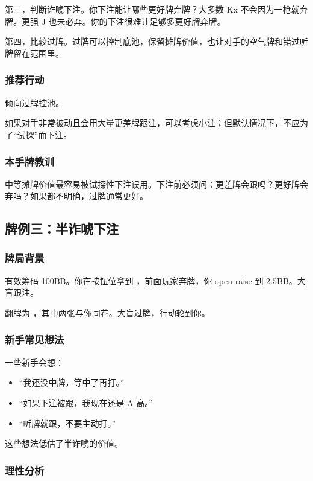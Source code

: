 第三，判断诈唬下注。你下注能让哪些更好牌弃牌？大多数 Kx 不会因为一枪就弃牌。更强 J 也未必弃。你的下注很难让足够多更好牌弃牌。

第四，比较过牌。过牌可以控制底池，保留摊牌价值，也让对手的空气牌和错过听牌留在范围里。

\subsubsection*{推荐行动}

倾向过牌控池。

如果对手非常被动且会用大量更差牌跟注，可以考虑小注；但默认情况下，不应为了“试探”而下注。

\subsubsection*{本手牌教训}

中等摊牌价值最容易被试探性下注误用。下注前必须问：更差牌会跟吗？更好牌会弃吗？如果都不明确，过牌通常更好。

\subsection{牌例三：半诈唬下注}

\subsubsection*{牌局背景}

有效筹码 100BB。你在按钮位拿到 ，前面玩家弃牌，你 open raise 到 2.5BB。大盲跟注。

翻牌为 ，其中两张与你同花。大盲过牌，行动轮到你。

\subsubsection*{新手常见想法}

一些新手会想：

\begin{itemize}
\item “我还没中牌，等中了再打。”
\item “如果下注被跟，我现在还是 A 高。”
\item “听牌就跟，不要主动打。”
\end{itemize}

这些想法低估了半诈唬的价值。

\subsubsection*{理性分析}


